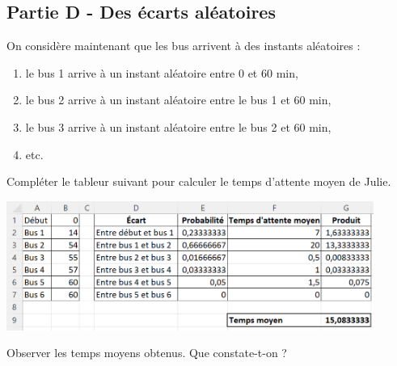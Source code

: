 \documentclass[a4paper,11pt,exos]{nsi} %
\begin{document}
\subsection*{Partie D - Des écarts aléatoires}
On considère maintenant que les bus arrivent à des instants aléatoires :
\begin{enumerate}[label=\textbullet]
    \item le bus 1 arrive à un instant aléatoire entre 0 et 60 min,
    \item le bus 2 arrive à un instant aléatoire entre le bus 1 et 60 min,
    \item le bus 3 arrive à un instant aléatoire entre le bus 2 et 60 min,
    \item etc.
\end{enumerate}
Compléter le tableur suivant pour calculer le temps d'attente moyen de Julie. 
\begin{center}
    \includegraphics[width=12cm]{Paradoxe.png}
\end{center}
Observer les temps moyens obtenus. Que constate-t-on ?
\end{document}
